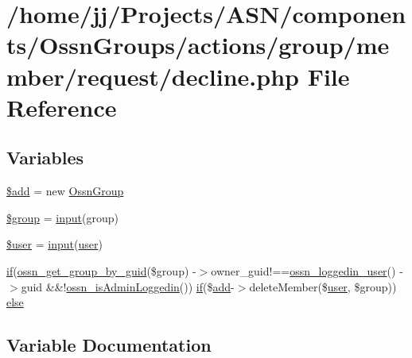 \hypertarget{decline_8php}{}\section{/home/jj/\+Projects/\+A\+S\+N/components/\+Ossn\+Groups/actions/group/member/request/decline.php File Reference}
\label{decline_8php}
\subsection*{Variables}
\begin{DoxyCompactItemize}
\item 
\hyperlink{decline_8php_a76aeb354fc71a358526ea9fbd7aae7a4}{\$add} = new \hyperlink{class_ossn_group}{Ossn\+Group}
\item 
\hyperlink{decline_8php_ad530a85733b0ec1dc321859fd8faa0dc}{\$group} = \hyperlink{ossn_8lib_8input_8php_a64ebee98b041c4f75f71ed3cd73cc8ed}{input}(\textquotesingle{}group\textquotesingle{})
\item 
\hyperlink{decline_8php_a598ca4e71b15a1313ec95f0df1027ca5}{\$user} = \hyperlink{ossn_8lib_8input_8php_a64ebee98b041c4f75f71ed3cd73cc8ed}{input}(\textquotesingle{}\hyperlink{ossn_8config_8db_8example_8php_a802544b7ba9f79bbf24ef67773d53bed}{user}\textquotesingle{})
\item 
\hyperlink{jquery_8tokeninput_8js_ad8dd46a3cbc004569e34401e9e71771a}{if}(\hyperlink{libraries_2groups_8php_a134232596460947e7923a5ec7b255375}{ossn\+\_\+get\+\_\+group\+\_\+by\+\_\+guid}(\$group) -\/$>$owner\+\_\+guid!==\hyperlink{ossn_8lib_8users_8php_aa3c8068d0e6638b414d6a2f6c62565b8}{ossn\+\_\+loggedin\+\_\+user}() -\/$>$guid \&\&!\hyperlink{ossn_8lib_8users_8php_abf45a4c659ffd196160e8173c2af1106}{ossn\+\_\+is\+Admin\+Loggedin}()) \hyperlink{jquery_8tokeninput_8js_ad8dd46a3cbc004569e34401e9e71771a}{if}(\$\hyperlink{theme_8min_8js_a79ed6f45c867c160601f70dfa5ec2f95}{add}-\/$>$delete\+Member(\$\hyperlink{ossn_8config_8db_8example_8php_a802544b7ba9f79bbf24ef67773d53bed}{user}, \$group)) \hyperlink{decline_8php_a4f1195684d7ac85781b27318fe34bbb0}{else}
\end{DoxyCompactItemize}


\subsection{Variable Documentation}
